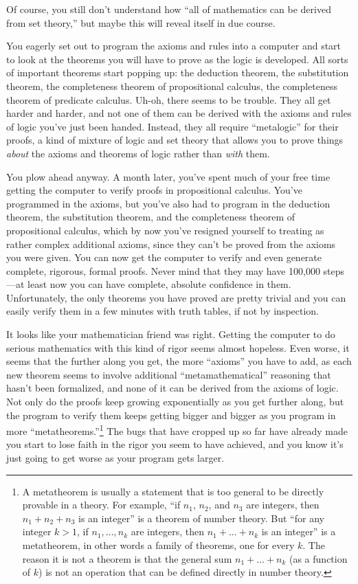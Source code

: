 Of course, you still don't understand how ``all of mathematics can be
derived from set theory,'' but maybe this will reveal itself in due
course.

You eagerly set out to program the axioms and rules into a computer and start
to look at the theorems you will have to prove as the logic is developed.  All
sorts of important theorems start popping up:  the deduction
theorem, the substitution theorem, the completeness theorem of propositional calculus, the completeness theorem of predicate calculus.  Uh-oh,
there seems to be trouble.  They all get harder and harder, and not one of
them can be derived with the axioms and rules of logic you've just been
handed.  Instead, they all require ``metalogic'' for their proofs, a kind of
mixture of logic and set theory that allows you to prove things {\em about}
the axioms and theorems of logic rather than {\em with} them.

You plow ahead anyway.  A month later, you've spent much of your
free time getting the computer to verify proofs in propositional calculus.
You've programmed in the axioms, but you've also had to program in the
deduction theorem, the substitution theorem, and the completeness theorem of
propositional calculus, which by now you've resigned yourself to treating as
rather complex additional axioms, since they can't be proved from the axioms
you were given.  You can now get the computer to verify and even generate
complete, rigorous, formal proofs.  Never mind that they
may have 100,000 steps---at least now you can have complete, absolute
confidence in them.  Unfortunately, the only theorems you have proved are
pretty trivial and you can easily verify them in a few minutes with truth
tables, if not by inspection.

It looks like your mathematician friend was right.  Getting the computer to do
serious mathematics with this kind of rigor seems almost hopeless.  Even
worse, it seems that the further along you get, the more ``axioms'' you have
to add, as each new theorem seems to involve additional ``metamathematical''
reasoning that hasn't been formalized, and none of it can be derived from the
axioms of logic.  Not only do the proofs keep growing exponentially as you get
further along, but the program to verify them keeps getting bigger and bigger
as you program in more ``metatheorems.''\footnote{A
metatheorem is usually a statement that is too general to be directly provable
in a theory.  For example, ``if $n_1$, $n_2$, and $n_3$ are integers, then
$n_1+n_2+n_3$ is an integer'' is a theorem of number theory.  But ``for any
integer $k > 1$, if $n_1, \ldots, n_k$ are integers, then $n_1+\ldots +n_k$ is
an integer'' is a metatheorem, in other words a family of theorems, one for
every $k$.  The reason it is not a theorem is that the general sum $n_1+\ldots
+n_k$ (as a function of $k$) is not an operation that can be defined directly
in number theory.} The bugs that have cropped up
so far have already made you start to lose faith in the rigor you seem to have
achieved, and you know it's just going to get worse as your program gets larger.

